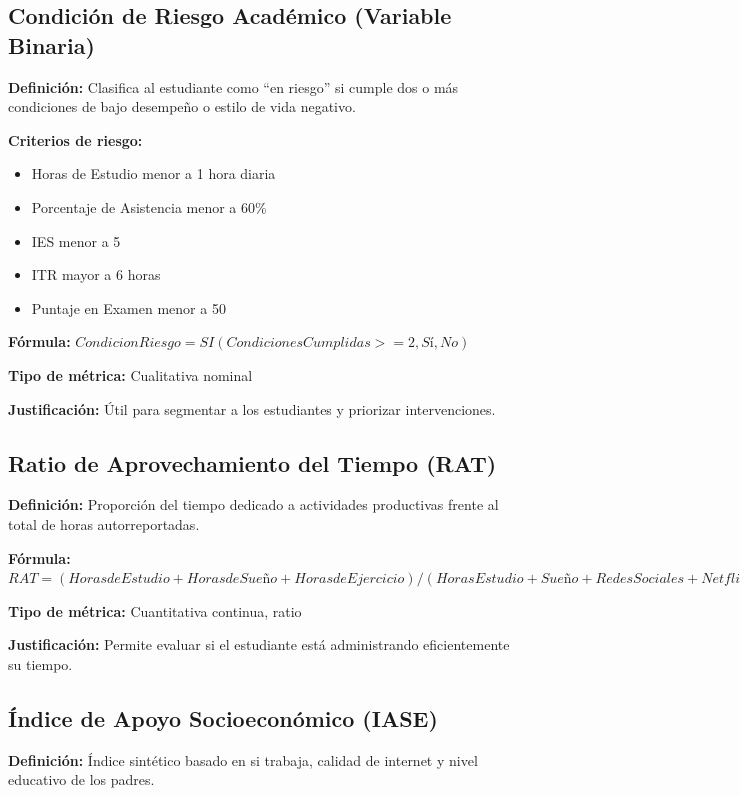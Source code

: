 \documentclass[12pt,letterpaper]{report}
\begin{document}
\subsection{Condición de Riesgo Académico (Variable Binaria)}

\textbf{Definición:} Clasifica al estudiante como “en riesgo” si cumple dos o más condiciones de bajo desempeño o estilo de vida negativo.


\textbf{Criterios de riesgo:}
\begin{itemize}
    \item Horas de Estudio menor a 1 hora diaria
    \item Porcentaje de Asistencia menor a 60\%
    \item IES menor a 5
    \item ITR mayor a 6 horas
    \item Puntaje en Examen menor a 50
\end{itemize}

\textbf{Fórmula:}
\(CondicionRiesgo = SI(CondicionesCumplidas >= 2, Sí, No)\)

\textbf{Tipo de métrica:}  Cualitativa nominal

\textbf{Justificación:} Útil para segmentar a los estudiantes y priorizar intervenciones.


\subsection{Ratio de Aprovechamiento del Tiempo (RAT)}

\textbf{Definición:} Proporción del tiempo dedicado a actividades productivas frente al total de horas autorreportadas.

\textbf{Fórmula:}
\(RAT = (Horas de Estudio + Horas de Sueño + Horas de Ejercicio) / (Horas Estudio + Sueño + Redes Sociales + Netflix + Ejercicio)
\)

\textbf{Tipo de métrica:} Cuantitativa continua, ratio

\textbf{Justificación:} Permite evaluar si el estudiante está administrando eficientemente su tiempo.


\subsection{Índice de Apoyo Socioeconómico (IASE)}

\textbf{Definición:} Índice sintético basado en si trabaja, calidad de internet y nivel educativo de los padres.
\end{document}
